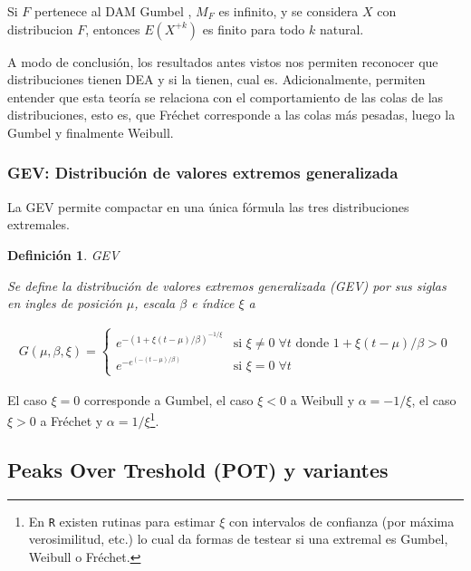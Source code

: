 \documentclass[
  12pt]{article}
\newtheorem{definition}{Definición}[section]
\begin{document}
\begin{Corolario}
Si $F$ pertenece al DAM Gumbel , $M_F$ es infinito, y se considera $X$ con distribucion $F$, entonces $E(X^{+k})$ es finito para todo $k$ natural.
\end{Corolario}

A modo de conclusión, los resultados antes vistos nos permiten reconocer
que distribuciones tienen DEA y si la tienen, cual es. Adicionalmente,
permiten entender que esta teoría se relaciona con el comportamiento de
las colas de las distribuciones, esto es, que Fréchet corresponde a las
colas más pesadas, luego la Gumbel y finalmente Weibull.

\newpage

\subsubsection*{GEV: Distribución de valores extremos generalizada}

La GEV permite compactar en una única fórmula las tres distribuciones
extremales.

\begin{definition} GEV

Se define la distribución de valores extremos generalizada (GEV) por sus siglas en ingles de posición $\mu$, escala $\beta$ e índice $\xi$ a

\begin{align*}
G(\mu, \beta, \xi) = \begin{cases}
e^{ -\left ( 1+\xi(t-\mu)/\beta \right )^{-1/\xi} } & \text{si } \xi\neq 0\; \forall t \text{ donde } 1+\xi(t-\mu)/\beta>0\\ 
e^{ -e^{\left ( -(t-\mu)/\beta \right )}} & \text{si } \xi=0 \; \forall t
\end{cases}
\end{align*}
\end{definition}

El caso \(\xi=0\) corresponde a Gumbel, el caso \(\xi<0\) a Weibull y
\(\alpha=-1/ \xi\), el caso \(\xi>0\) a Fréchet y
\(\alpha=1/ \xi\)\footnote{En \texttt{R} existen rutinas para estimar $\xi$ con intervalos de confianza (por máxima verosimilitud, etc.) lo cual da formas de testear si una extremal es Gumbel, Weibull o Fréchet.}.

\newpage

\subsection{Peaks Over Treshold (POT) y
variantes}\label{peaks-over-treshold-pot-y-variantes}
\end{document}
